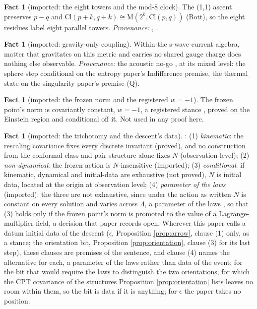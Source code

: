 \documentclass[11pt]{article}
\theoremstyle{definition}
\newtheorem{fact}[theorem]{Fact}
\newcommand{\Cl}{\mathrm{Cl}}
\newcommand{\Mat}{\mathrm{M}}
\begin{document}
\begin{fact}[imported: the eight towers and the mod-8 clock]\label{fact:towers}
The (1,1) ascent preserves $p - q$ and $\Cl(p+k, q+k) \cong \Mat(2^{k}, \Cl(p,q))$ (Bott), so the eight residues label eight parallel towers. \emph{Provenance:} \cite[Thms.~3.2, 3.6, Rem.~3.7]{ButlerT3}, \cite[\S7]{ButlerT1}.
\end{fact}

\begin{fact}[imported: gravity-only coupling]\label{fact:acoustic}
Within the s-wave current algebra, matter that gravitates on this metric and carries no shared gauge charge does nothing else observable. \emph{Provenance:} the acoustic no-go \cite[\S5]{ButlerT10}, at its mixed level: the sphere step conditional on the entropy paper's Indifference premise, the thermal state on the singularity paper's premise (Q).
\end{fact}

\begin{fact}[imported: the frozen norm and the registered $w = -1$]\label{fact:frozen}
The frozen point's norm is covariantly constant, $w = -1$, a registered stance \cite[Prop.~4.2]{ButlerT10}, proved on the Einstein region and conditional off it. Not used in any proof here.
\end{fact}

\begin{fact}[imported: the trichotomy and the descent's data]\label{fact:trichotomy}
\cite[Prop.~7.6]{ButlerT12}: (1) \emph{kinematic}: the rescaling covariance fixes every discrete invariant (proved), and no construction from the conformal class and pair structure alone fixes $N$ (observation level); (2) \emph{non-dynamical}: the frozen action is $N$-insensitive (imported); (3) \emph{conditional}: if kinematic, dynamical and initial-data are exhaustive (not proved), $N$ is initial data, located at the origin at observation level; (4) \emph{parameter of the laws} (imported): the three are not exhaustive, since under the action as written $N$ is constant on every solution and varies across $\Lambda$, a parameter of the laws \cite[Prop.~5.8]{ButlerT10}, so that (3) holds only if the frozen point's norm is promoted to the value of a Lagrange-multiplier field, a decision that paper records open. Wherever this paper calls a datum initial data of the descent ($\epsilon$, Proposition \ref{prop:arrow}, clause (1) only, as a stance; the orientation bit, Proposition \ref{prop:orientation}, clause (3) for its last step), these clauses are premises of the sentence, and clause (4) names the alternative for each, a parameter of the laws rather than data of the event: for the bit that would require the laws to distinguish the two orientations, for which the CPT covariance of the structures Proposition \ref{prop:orientation} lists leaves no room within them, so the bit is data if it is anything; for $\epsilon$ the paper takes no position.
\end{fact}
\end{document}
